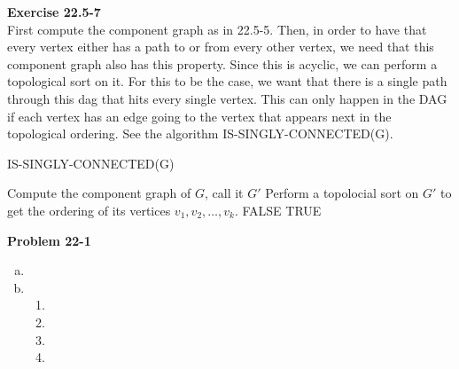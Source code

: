 \documentclass{article}
\begin{document}
\noindent\textbf{Exercise 22.5-7}\\ 
First compute the component graph as in 22.5-5. Then, in order to have that every vertex either has a path to or from every other vertex, we need that this component graph also has this property. Since this is acyclic, we can perform a topological sort on it. For this to be the case, we want that there is a single path through this dag that hits every single vertex. This can only happen in the DAG if each vertex has an edge going to the vertex that appears next in the topological ordering. See the algorithm IS-SINGLY-CONNECTED(G).\\
\begin{algorithm}
\caption{IS-SINGLY-CONNECTED(G)}
\begin{algorithmic}
\State Compute the component graph of $G$, call it $G'$
\State Perform a topolocial sort on $G'$ to get the ordering of its vertices $v_1,v_2, \ldots, v_k$.
\State \Return FALSE
\EndIf
\EndFor
\State \Return TRUE
\end{algorithmic}
\end{algorithm}

\noindent\textbf{Problem 22-1}\\
\begin{enumerate}[a)]
\item
\begin{comment}
\begin{enumerate}[1.]
\item

\item

\item

\end{enumerate}
\end{comment}

\item
\begin{enumerate}[1.]
\item
\item
\item
\item
\end{enumerate}
\end{enumerate}
\end{document}
